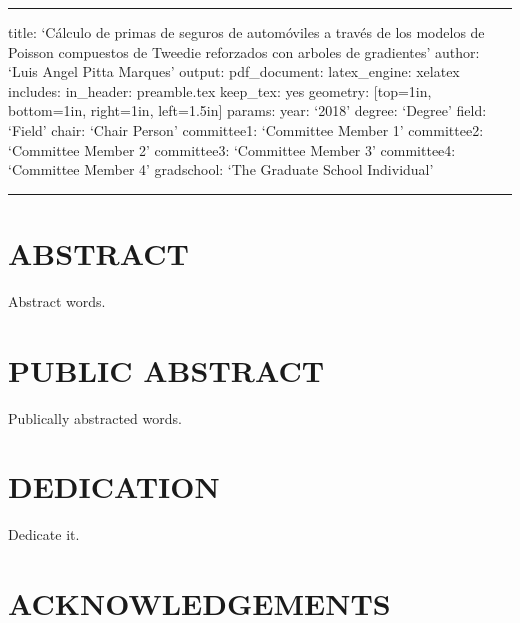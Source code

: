 \documentclass[]{article}
\title{}
\author{}
\date{}
\begin{document}
\begin{center}\rule{0.5\linewidth}{\linethickness}\end{center}

title: `Cálculo de primas de seguros de automóviles a través de los
modelos de Poisson compuestos de Tweedie reforzados con arboles de
gradientes' author: `Luis Angel Pitta Marques' output: pdf\_document:
latex\_engine: xelatex includes: in\_header: preamble.tex keep\_tex: yes
geometry: {[}top=1in, bottom=1in, right=1in, left=1.5in{]} params: year:
`2018' degree: `Degree' field: `Field' chair: `Chair Person' committee1:
`Committee Member 1' committee2: `Committee Member 2' committee3:
`Committee Member 3' committee4: `Committee Member 4' gradschool: `The
Graduate School Individual'

\begin{center}\rule{0.5\linewidth}{\linethickness}\end{center}

 \pagestyle{empty} \copyrightpage

\newpage

\pagestyle{fancy}  \fancyhead[R]{\thepage}
\fancyfoot[C]{} \chapter*{ABSTRACT}

Abstract words.

\newpage

 \fancyhead[R]{\thepage} \fancyfoot[C]{}
\chapter*{PUBLIC ABSTRACT}

Publically abstracted words.

\newpage

 \fancyhead[R]{\thepage} \fancyfoot[C]{}
\chapter*{DEDICATION} 

Dedicate it.

\newpage

 \fancyhead[R]{\thepage} \fancyfoot[C]{}
\chapter*{ACKNOWLEDGEMENTS}
\end{document}
